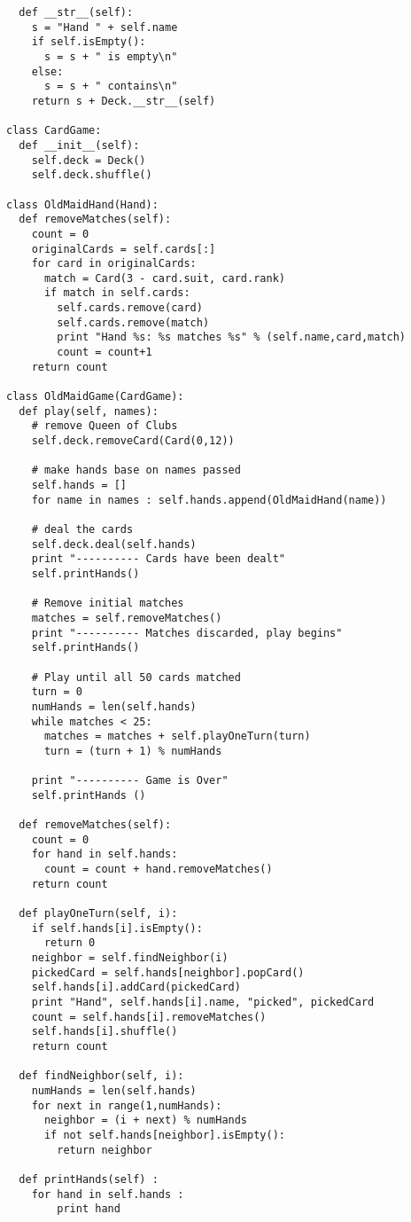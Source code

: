 \begin{verbatim}
  def __str__(self):
    s = "Hand " + self.name
    if self.isEmpty():
      s = s + " is empty\n"
    else:
      s = s + " contains\n"
    return s + Deck.__str__(self)

class CardGame:
  def __init__(self):
    self.deck = Deck()
    self.deck.shuffle()

class OldMaidHand(Hand):
  def removeMatches(self):
    count = 0
    originalCards = self.cards[:]
    for card in originalCards:
      match = Card(3 - card.suit, card.rank)
      if match in self.cards:
        self.cards.remove(card)
        self.cards.remove(match)
        print "Hand %s: %s matches %s" % (self.name,card,match)
        count = count+1
    return count

class OldMaidGame(CardGame):
  def play(self, names):
    # remove Queen of Clubs
    self.deck.removeCard(Card(0,12))

    # make hands base on names passed
    self.hands = []
    for name in names : self.hands.append(OldMaidHand(name))

    # deal the cards
    self.deck.deal(self.hands)
    print "---------- Cards have been dealt"
    self.printHands()

    # Remove initial matches
    matches = self.removeMatches()
    print "---------- Matches discarded, play begins"
    self.printHands()

    # Play until all 50 cards matched
    turn = 0
    numHands = len(self.hands)
    while matches < 25:
      matches = matches + self.playOneTurn(turn)
      turn = (turn + 1) % numHands

    print "---------- Game is Over"
    self.printHands ()

  def removeMatches(self):
    count = 0
    for hand in self.hands:
      count = count + hand.removeMatches()
    return count

  def playOneTurn(self, i):
    if self.hands[i].isEmpty():
      return 0
    neighbor = self.findNeighbor(i)
    pickedCard = self.hands[neighbor].popCard()
    self.hands[i].addCard(pickedCard)
    print "Hand", self.hands[i].name, "picked", pickedCard
    count = self.hands[i].removeMatches()
    self.hands[i].shuffle()
    return count

  def findNeighbor(self, i):
    numHands = len(self.hands)
    for next in range(1,numHands):
      neighbor = (i + next) % numHands
      if not self.hands[neighbor].isEmpty():
        return neighbor

  def printHands(self) :
    for hand in self.hands :
        print hand

\end{verbatim}
\afterverb


